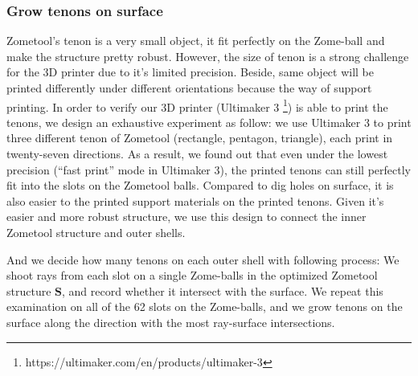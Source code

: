 \subsubsection{Grow tenons on surface}
Zometool's tenon is a very small object, it fit perfectly on the Zome-ball and make the structure pretty robust. 
However, the size of tenon is a strong challenge for the 3{D} printer due to it's limited precision. 
Beside, same object will be printed differently under different orientations because the way of support printing.
In order to verify our 3{D} printer (Ultimaker 3 \footnote{https://ultimaker.com/en/products/ultimaker-3}) is able to print the tenons, we design an exhaustive experiment as follow:
we use Ultimaker 3 to print three different tenon of Zometool (rectangle, pentagon, triangle), each print in twenty-seven directions. 
As a result, we found out that even under the lowest precision (``fast print'' mode in Ultimaker 3), the printed tenons can still perfectly fit into the slots on the Zometool balls.
Compared to dig holes on  surface, it is also easier to  the printed support materials on the printed tenons.
Given it's easier  and more robust structure, we use this design to connect the inner Zometool structure and outer shells. 

And we decide how many tenons on each outer shell with  following process:
We shoot rays from each slot on a single Zome-balls in the optimized Zometool structure $\mathbf{S}$, and record whether it intersect with the surface.
We repeat this examination on all of the 62 slots on the Zome-balls, and we grow tenons on the surface along the direction with the most ray-surface intersections.

    
